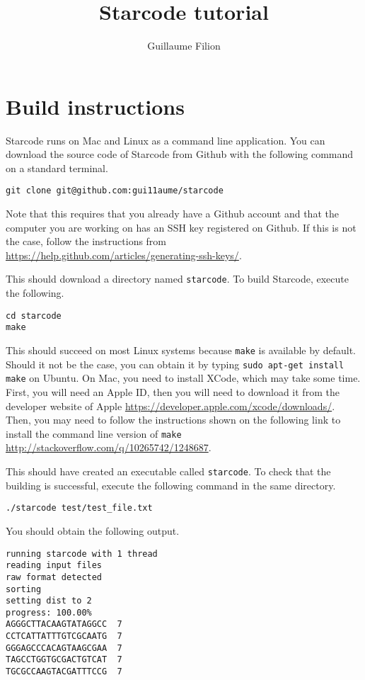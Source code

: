 \documentclass[12pt]{article}
\title{Starcode tutorial}
\author{Guillaume Filion}
\begin{document}
\maketitle

\section{Build instructions}

Starcode runs on Mac and Linux as a command line application.
You can download the source code of Starcode from Github with
the following command on a standard terminal.

\begin{verbatim}
git clone git@github.com:gui11aume/starcode
\end{verbatim}

Note that this requires that you already have a Github account
and that the computer you are working on has an SSH  key registered
on Github. If this is not the case, follow the instructions from
\url{https://help.github.com/articles/generating-ssh-keys/}.

This should download a directory named \texttt{starcode}. To build
Starcode, execute the following.

\begin{verbatim}
cd starcode
make
\end{verbatim}

This should succeed on most Linux systems because \texttt{make} is
available by default. Should it not be the case, you can obtain it by
typing \texttt{sudo apt-get install make} on Ubuntu. On Mac, you need
to install XCode, which may take some time. First, you will need an
Apple ID, then you will need to download it from the developer
website of Apple \url{https://developer.apple.com/xcode/downloads/}.
Then, you may need to follow the instructions shown on the following
link to install the command line version of \texttt{make}
\url{http://stackoverflow.com/q/10265742/1248687}.

This should have created an executable called \texttt{starcode}. To
check that the building is successful, execute the following command
in the same directory.

\begin{verbatim}
./starcode test/test_file.txt
\end{verbatim}

You should obtain the following output.

\begin{verbatim}
running starcode with 1 thread
reading input files
raw format detected
sorting
setting dist to 2
progress: 100.00%
AGGGCTTACAAGTATAGGCC  7
CCTCATTATTTGTCGCAATG  7
GGGAGCCCACAGTAAGCGAA  7
TAGCCTGGTGCGACTGTCAT  7
TGCGCCAAGTACGATTTCCG  7
\end{verbatim}
\end{document}
